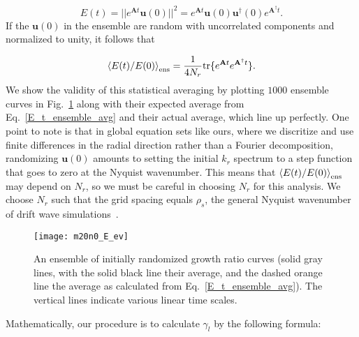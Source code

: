 \documentclass[letter,scriptaddress,twocolumn, prl,showkeys]{revtex4}
\def\beq{\begin{equation}}
\def\eeq{\end{equation}}
\begin{document}
\beq
\label{E_t_from_u0}
E(t) = ||e^{\mathbf{A} t} \mathbf{u}(0)||^2 = e^{\mathbf{A} t} \mathbf{u}(0) \mathbf{u}^{\dagger}(0) e^{\mathbf{A}^{\dagger}t}.
\eeq
If the $\mathbf{u}(0)$ in the ensemble are random with uncorrelated components and normalized to unity, it follows that~\cite{camargo1998}

\beq
\label{E_t_ensemble_avg}
\left< E(t)/E(0) \right>_{{\rm{ens}}} = \frac{1}{4 N_r} {\rm{tr}} \{ e^{\mathbf{A} t} e^{\mathbf{A}^{\dagger}t} \}.
\eeq
We show the validity of this statistical averaging by plotting $1000$ ensemble curves in Fig.~\ref{m20n0_E_ev} along with their expected average from Eq.~\ref{E_t_ensemble_avg} and their actual average,
which line up perfectly.
One point to note is that in global equation sets like ours, where we discritize and use finite differences in the radial direction rather than a Fourier decomposition, randomizing $\mathbf{u}(0)$
amounts to setting the initial $k_r$ spectrum to a step function that goes to zero at the Nyquist wavenumber. This means that $\left< E(t)/E(0) \right>_{{\rm{ens}}}$ may depend on $N_r$, so we must be careful in
choosing $N_r$ for this analysis. We choose $N_r$ such that the grid spacing equals $\rho_s$, the general Nyquist wavenumber of drift wave simulations~\cite{scott1992}.

\begin{figure}
\centerline{\texttt{[image: m20n0\_E\_ev]}}
\caption{An ensemble of initially randomized growth ratio curves (solid gray lines, with the solid black line their average, and the dashed orange line the average as calculated from Eq.~\ref{E_t_ensemble_avg}).
The vertical lines indicate various linear time scales.}
\label{m20n0_E_ev}
\end{figure}

Mathematically, our procedure is to calculate $\gamma_l$ by the following formula:
\end{document}
